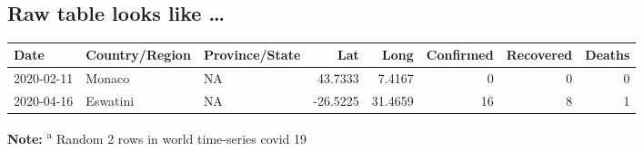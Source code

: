 \documentclass[
  11pt,
]{article}
\begin{document}
~

\hypertarget{raw-table-looks-like}{%
\subsection{Raw table looks like \ldots{}}\label{raw-table-looks-like}}

\begin{longtable}[]{@{}lllrrrrr@{}}
\toprule
Date & Country/Region & Province/State & Lat & Long & Confirmed &
Recovered & Deaths\tabularnewline
\midrule
\endhead
2020-02-11 & Monaco & NA & 43.7333 & 7.4167 & 0 & 0 & 0\tabularnewline
2020-04-16 & Eswatini & NA & -26.5225 & 31.4659 & 16 & 8 &
1\tabularnewline
\bottomrule
\end{longtable}

\textbf{Note:} \textsuperscript{a} Random 2 rows in world time-series
covid 19
\end{document}
